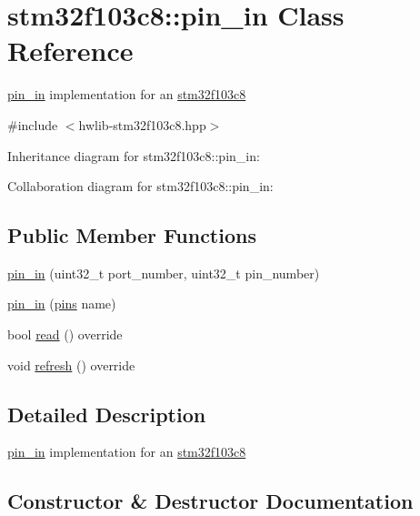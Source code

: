 \hypertarget{classstm32f103c8_1_1pin__in}{}\section{stm32f103c8\+:\+:pin\+\_\+in Class Reference}
\label{classstm32f103c8_1_1pin__in}


\hyperlink{classstm32f103c8_1_1pin__in}{pin\+\_\+in} implementation for an \hyperlink{namespacestm32f103c8}{stm32f103c8}  




{\ttfamily \#include $<$hwlib-\/stm32f103c8.\+hpp$>$}



Inheritance diagram for stm32f103c8\+:\+:pin\+\_\+in\+:


Collaboration diagram for stm32f103c8\+:\+:pin\+\_\+in\+:
\subsection*{Public Member Functions}
\begin{DoxyCompactItemize}
\item 
\hyperlink{classstm32f103c8_1_1pin__in_a5524290b747d335adf5536ee28ec4707}{pin\+\_\+in} (uint32\+\_\+t port\+\_\+number, uint32\+\_\+t pin\+\_\+number)
\item 
\hyperlink{classstm32f103c8_1_1pin__in_ac6e4218a9392cd25a72dc363bbbb2a00}{pin\+\_\+in} (\hyperlink{namespacestm32f103c8_a69d642506db309a7e64295d35ec21ff6}{pins} name)
\item 
bool \hyperlink{classstm32f103c8_1_1pin__in_aba2e7e6efa14b83d12c30b63f67b9270}{read} () override
\item 
void \hyperlink{classstm32f103c8_1_1pin__in_a9942b1766a4c01d0efcbe893bcd7b62f}{refresh} () override
\end{DoxyCompactItemize}


\subsection{Detailed Description}
\hyperlink{classstm32f103c8_1_1pin__in}{pin\+\_\+in} implementation for an \hyperlink{namespacestm32f103c8}{stm32f103c8} 

\subsection{Constructor \& Destructor Documentation}
\mbox{\label{classstm32f103c8_1_1pin__in_a5524290b747d335adf5536ee28ec4707}} 
